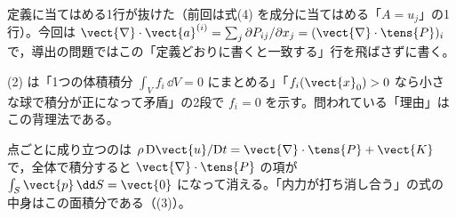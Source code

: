 \item {} 定義に当てはめる1行が抜けた（前回は式(4) を成分に当てはめる「$A=u_{j}$」の1行）。今回は $\vect{\nabla}\cdot\vect{a}^{(i)}=\sum_{j}\partial P_{ij}/\partial x_{j}=(\vect{\nabla}\cdot\tens{P})_{i}$ で，導出の問題ではこの「定義どおりに書くと一致する」行を飛ばさずに書く。
\item (2) は「1つの体積積分 $\int_{V}f_{i}\,\dd V=0$ にまとめる」「$f_{i}(\vect{x}_{0})>0$ なら小さな球で積分が正になって矛盾」の2段で $f_{i}=0$ を示す。問われている「理由」はこの背理法である。
\item 点ごとに成り立つのは $\rho\,\mathrm{D}\vect{u}/\mathrm{D}t=\vect{\nabla}\cdot\tens{P}+\vect{K}$ で，全体で積分すると $\vect{\nabla}\cdot\tens{P}$ の項が $\int_{S}\vect{p}\,\dd S=\vect{0}$ になって消える。「内力が打ち消し合う」の式の中身はこの面積分である（(3)）。
